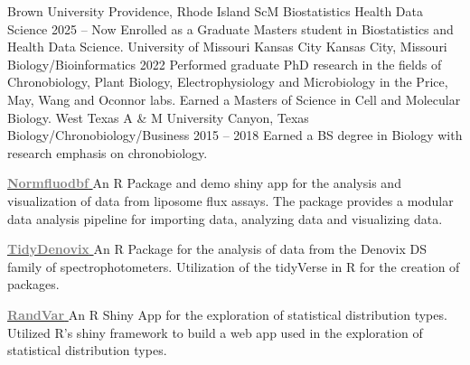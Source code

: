 \documentclass[9pt]{adeckcv} %
\begin{document}
\newpage




\begin{entrylist}
	\entry
	  {\large{Brown University}} 
    {Providence, Rhode Island}
    {ScM Biostatistics Health Data Science}
    {2025 -- Now}
		{\itemizeeducationtwo
		{Enrolled as a Graduate Masters student in Biostatistics and Health Data Science.}
		}
	\entry
	  {\large{University of Missouri Kansas City}} 
    {Kansas City, Missouri}
    {Biology/Bioinformatics}
    {2022}
		{\itemizeeducationone
		{Performed graduate PhD research in the fields of Chronobiology, Plant Biology, Electrophysiology and Microbiology in the Price, May, Wang and Oconnor labs.}
		{Earned a Masters of Science in Cell and Molecular Biology.}
		}
	\entry
	  {\large{West Texas A \& M University}} 
	  {Canyon, Texas}
		{Biology/Chronobiology/Business}
		{2015 -- 2018}
		{\itemizeeducationtwo
		{Earned a BS degree in Biology with research emphasis on chronobiology.}
		}
\end{entrylist}



\project
{\href{https://alphaprime7.github.io/normfluodbf/}{\textbf{ \textcolor{gray}{Normfluodbf}} }}
{}
{}
{}
{An R Package and demo shiny app for the analysis and visualization of data from liposome flux assays.}
{The package provides a modular data analysis pipeline for importing data, analyzing data and visualizing data.}

\project
{\href{https://alphaprime7.github.io/tidyDenovix/}{\textbf{ \textcolor{gray}{TidyDenovix}} }}
{}
{}
{}
{An R Package for the analysis of data from the Denovix DS family of spectrophotometers.}
{Utilization of the tidyVerse in R for the creation of packages.}

\project
{\href{https://github.com/bhds2010/randvar}{\textbf{ \textcolor{gray}{RandVar}} }}
{}
{}
{}
{An R Shiny App for the exploration of statistical distribution types.}
{Utilized R's shiny framework to build a web app used in the exploration of statistical distribution types.}
\end{document}
